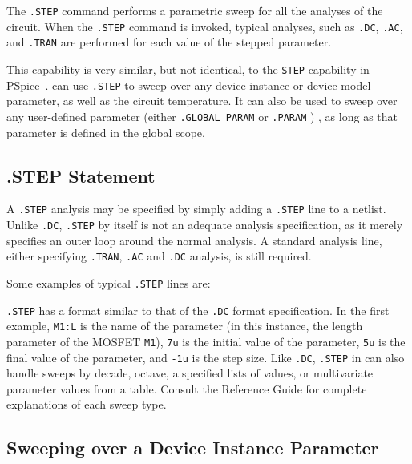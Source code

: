 The \verb|.STEP| command performs a parametric sweep for all the
analyses of the circuit.  When the \verb|.STEP| command is invoked,
typical analyses, such as \verb|.DC|, \verb|.AC|, and \verb|.TRAN| are
performed for each value of the stepped parameter.

This capability is very similar, but not identical, to the \verb|STEP|
capability in PSpice~\cite{PSpiceUG:1998}.  \Xyce{} can use
\verb|.STEP| to sweep over any device instance or device model
parameter, as well as the circuit temperature.    It can also be used 
to sweep over any user-defined parameter (either \texttt{.GLOBAL\_PARAM} 
or \texttt{.PARAM} ) , as long as that parameter is  defined in the 
global scope.

\subsection{.STEP Statement}

A \verb|.STEP| analysis may be specified by simply adding a
\verb|.STEP| line to a netlist.  Unlike \verb|.DC|, \verb|.STEP| by
itself is not an adequate analysis specification, as it merely
specifies an outer loop around the normal analysis.  A standard
analysis line, either specifying \verb|.TRAN|, \verb|.AC| and
\verb|.DC| analysis, is still required.

Some examples of typical \verb|.STEP| lines are:


\verb|.STEP| has a format similar to that of the \verb|.DC| format
specification.  In the first example, \verb|M1:L| is the name of the
parameter (in this instance, the length parameter of the MOSFET
\texttt{M1}), \verb|7u| is the initial value of the parameter,
\verb|5u| is the final value of the parameter, and \verb|-1u| is the
step size.  Like \verb|.DC|, \verb|.STEP| in \Xyce{} can also handle
sweeps by decade, octave, a specified lists of values, or multivariate parameter values from a table.  Consult the
\Xyce{} Reference Guide\ReferenceGuide{} for complete explanations of each sweep type.

\subsection{Sweeping over a Device Instance Parameter}
\label{step_InstanceParam}

